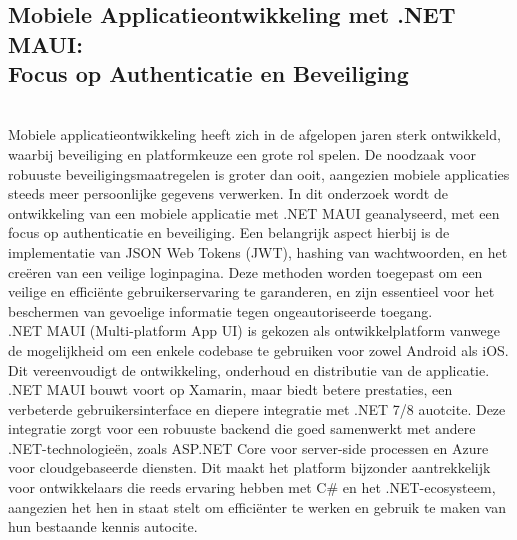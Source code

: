 \chapter{}%
\label{ch:stand-van-zaken}


\section{Mobiele Applicatieontwikkeling met .NET MAUI:\\ Focus op Authenticatie en Beveiliging}\\

Mobiele applicatieontwikkeling heeft zich in de afgelopen jaren sterk ontwikkeld, waarbij beveiliging en platformkeuze een grote rol spelen. De noodzaak voor robuuste beveiligingsmaatregelen is groter dan ooit, aangezien mobiele applicaties steeds meer persoonlijke gegevens verwerken. In dit onderzoek wordt de ontwikkeling van een mobiele applicatie met .NET MAUI geanalyseerd, met een focus op authenticatie en beveiliging. Een belangrijk aspect hierbij is de implementatie van JSON Web Tokens (JWT), hashing van wachtwoorden, en het creëren van een veilige loginpagina. Deze methoden worden toegepast om een veilige en efficiënte gebruikerservaring te garanderen, en zijn essentieel voor het beschermen van gevoelige informatie tegen ongeautoriseerde toegang. \\

.NET MAUI (Multi-platform App UI) is gekozen als ontwikkelplatform vanwege de mogelijkheid om een enkele codebase te gebruiken voor zowel Android als iOS. Dit vereenvoudigt de ontwikkeling, onderhoud en distributie van de applicatie. .NET MAUI bouwt voort op Xamarin, maar biedt betere prestaties, een verbeterde gebruikersinterface en diepere integratie met .NET 7/8 auotcite{}. Deze integratie zorgt voor een robuuste backend die goed samenwerkt met andere .NET-technologieën, zoals ASP.NET Core voor server-side processen en Azure voor cloudgebaseerde diensten. Dit maakt het platform bijzonder aantrekkelijk voor ontwikkelaars die reeds ervaring hebben met C# en het .NET-ecosysteem, aangezien het hen in staat stelt om efficiënter te werken en gebruik te maken van hun bestaande kennis autocite{}. \\

